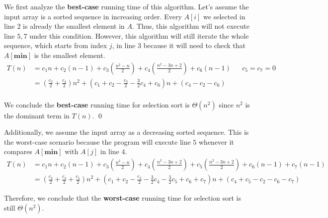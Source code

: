 \documentclass[a4paper]{article}
\makeatletter
\newenvironment{solution}
  {\begin{proof}[Solution]}
  {\end{proof}}
\renewenvironment{proof}[1][\proofname]{%
  \par\pushQED{\qed}\normalfont%
  \topsep6\p@\@plus6\p@\relax
  \trivlist\item[\hskip\labelsep\bfseries#1\@addpunct{.}]%
  \ignorespaces
}{%
  \popQED\endtrivlist\@endpefalse
}
\makeatother
\begin{document}
\begin{solution}
  We first analyze the \textbf{best-case} running time of this algorithm. Let's assume the input array is a sorted sequence in increasing order. Every $A[i]$ we selected in line $2$ is already the smallest element in $A$. Thus, this algorithm will not execute line $5, 7$ under this condition. However, this algorithm will still iterate the whole sequence, which starts from index $j$, in line $3$ because it will need to check that $A[\textbf{min}]$ is the smallest element.
  \begin{align*}
    T(n)  &= c_1 n + c_2(n - 1) + c_3(\frac{n^2 - n}{2}) + c_4(\frac{n^2 - 3n + 2}{2}) + c_6(n -1)&&\text{$c_5 = c_7 = 0$}\\
         &= (\frac{c_3}{2} + \frac{c_4}{2}) n^2 + (c_1 + c_2 - \frac{c_3}{2} - \frac{3}{2}c_4 + c_6)n + (c_4 - c_2 - c_6) \\
  \end{align*}

  We conclude the \textbf{best-case} running time for selection sort is $\Theta(n^2)$ since $n^2$ is the dominant term in $T(n)$. \qed

  Additionally, we assume the input array as a decreasing sorted sequence. This is the worst-case scenario because the program will execute line $5$ whenever it compares $A[\textbf{min}]$ with $A[j]$ in line $4$.
  \begin{align*}
    T(n) &=c_1 n + c_2(n - 1) + c_3(\frac{n^2 - n}{2}) + c_4(\frac{n^2 - 3n + 2}{2})+c_5(\frac{n^2 - 3n + 2}{2}) + c_6(n - 1) + c_7(n - 1)\\
         &= (\frac{c_3}{2} + \frac{c_4}{2} + \frac{c_5}{2})n^2 + (c_1 + c_2 - \frac{c_3}{2} - \frac{3}{2}c_4 - \frac{3}{2}c_5 + c_6 + c_7)n + (c_4 + c_5 - c_2 - c_6 - c_7)
  \end{align*}

  Therefore, we conclude that the \textbf{worst-case} running time for selection sort is still $\Theta(n^2)$.
\end{solution}
\end{document}
